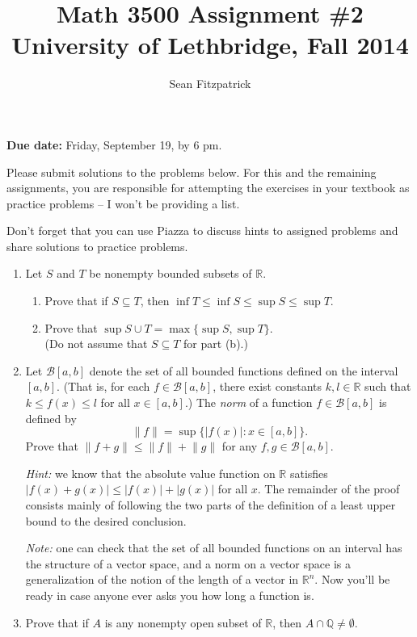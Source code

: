 \documentclass[letterpaper,12pt]{article}
\title{Math 3500 Assignment \#2\\University of Lethbridge, Fall 2014}
\author{Sean Fitzpatrick}
\newcommand{\R}{\mathbb{R}}
\newcommand{\abs}[1]{\lvert #1\rvert}
\begin{document}
 \maketitle

{\bf Due date:} Friday, September 19, by 6 pm.

\bigskip

Please submit solutions to the problems below. For this and the remaining assignments, you are responsible for attempting the exercises in your textbook as practice problems -- I won't be providing a list.

Don't forget that you can use Piazza to discuss hints to assigned problems and share solutions to practice problems.

\begin{enumerate}
 \item Let $S$ and $T$ be nonempty bounded subsets of $\R$. 
\begin{enumerate}
 \item Prove that if $S\subseteq T$, then $\inf T\leq \inf S\leq \sup S\leq \sup T$.
 \item Prove that $\sup S\cup T = \max\{\sup S, \sup T\}$. \\(Do not assume that $S\subseteq T$ for part (b).)
\end{enumerate}
 \item Let $\mathcal{B}[a,b]$ denote the set of all bounded functions defined on the interval $[a,b]$. (That is, for each $f\in \mathcal{B}[a,b]$, there exist constants $k,l\in\R$ such that $k\leq f(x)\leq l$ for all $x\in [a,b]$.) The {\em norm} of a function $f\in \mathcal{B}[a,b]$ is defined by
\[
 \lVert f\rVert = \sup\{\abs{f(x)} : x\in [a,b]\}.
\]
Prove that $\lVert f+g\rVert \leq \lVert f\rVert +\lVert g\rVert$ for any $f,g\in\mathcal{B}[a,b]$.

{\em Hint:} we know that the absolute value function on $\R$ satisfies $\abs{f(x)+g(x)}\leq \abs{f(x)}+\abs{g(x)}$ for all $x$. The remainder of the proof consists mainly of following the two parts of the definition of a least upper bound to the desired conclusion.

{\em Note:} one can check that the set of all bounded functions on an interval has the structure of a vector space, and a norm on a vector space is a generalization of the notion of the length of a vector in $\R^n$. Now you'll be ready in case anyone ever asks you how long a function is.

\item Prove that if $A$ is any nonempty open subset of $\R$, then $A\cap \mathbb{Q}\neq \emptyset$.


\end{enumerate}
\end{document}
